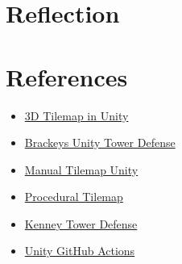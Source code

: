 \documentclass{article}
\begin{document}
\section{Reflection}
\label{sec:Reflection}


\section{References}
\label{sec:References}

\begin{itemize}
    \item \href{https://youtu.be/ulFc6p3hQzQ}{3D Tilemap in Unity}
    \item \href{https://www.youtube.com/playlist?list=PLPV2KyIb3jR4u5jX8za5iU1cqnQPmbzG0}{Brackeys Unity Tower Defense}
    \item \href{https://forum.unity.com/threads/how-can-i-place-a-tile-in-a-tilemap-by-script.508338/}{Manual Tilemap Unity}
    \item \href{https://blog.unity.com/technology/procedural-patterns-you-can-use-with-tilemaps-part-i}{Procedural Tilemap}
    \item \href{https://www.kenney.nl/assets/tower-defense-kit}{Kenney Tower Defense}
    \item \href{https://isaacbroyles.com/gamedev/2020/07/04/unity-github-actions.html}{Unity GitHub Actions}
\end{itemize}
\end{document}
